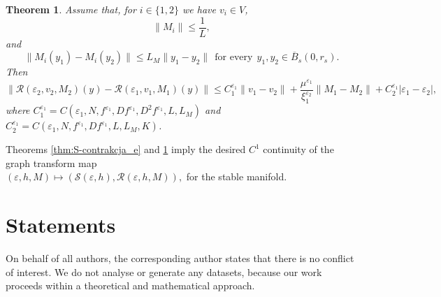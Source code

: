 \documentclass[11pt, leqno]{amsart}
\newtheorem{thm}{Theorem}[section]
\theoremstyle{definition}
\begin{document}
\begin{thm}
	\label{lem:S-M-Lip_2_e}
	Assume that, for $i\in \{1,2\}$ we have $v_i \in V$,
	\begin{equation}
		\|M_i\|\leq \frac{1}{L},
	\end{equation} and
	\begin{equation}
		\|M_i(y_1) - M_i(y_2)\| \leq L_M \|y_1 - y_2\|\ \ \textrm{for every}\ \ y_1,y_2\in \overline{B}_s(0,r_s).
	\end{equation}
	Then
	\begin{equation}
		\| \mathcal{R}(\varepsilon_2,v_2,M_2)(y) - \mathcal{R}(\varepsilon_1,v_1,M_1)(y)\|  \leq C^{\varepsilon_1}_1\|v_1-v_2\| + \frac{\mu^{\varepsilon_1}}{\xi^{\varepsilon_2}_1} \|M_1-M_2\| + C_2^{\varepsilon_1}|\varepsilon_1-\varepsilon_2|,
	\end{equation}
	where  $C^{\varepsilon_1}_1=C(\varepsilon_1,N,f^{\varepsilon_1},Df^{\varepsilon_1},D^2f^{\varepsilon_1},L,L_M)$ and $C^{\varepsilon_1}_2=C(\varepsilon_1,N,f^{\varepsilon_1},Df^{\varepsilon_1},L,L_M,K)$.
\end{thm}
Theorems \ref{thm:S-contrakcja_e} and \ref{lem:S-M-Lip_2_e} imply the desired $C^1$ continuity of the graph transform map \\
$(\varepsilon,h,M)\mapsto (\mathcal{S}(\varepsilon,h),\mathcal{R}(\varepsilon,h,M)),
$ for the stable manifold.


\section*{Statements}
On behalf of all authors, the corresponding author states that there is no conflict of interest. We do not analyse or generate any datasets, because our work proceeds within a theoretical and mathematical approach.
\end{document}
